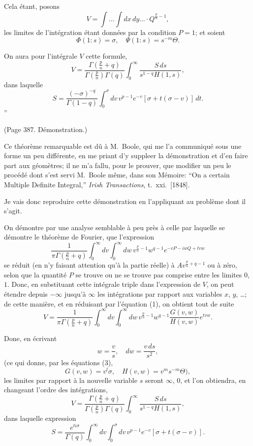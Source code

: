 \documentclass[11pt,a4paper]{book}
\begin{document}
Cela \'{e}tant, posons
\[
V = \int \ldots \int dx\,dy\ldots \cdot Q^{\frac{p}{n}-1}, \tag{2}
\]
les limites de l'int\'{e}gration \'{e}tant donn\'{e}es par la condition $P = 1$; et soient
\[
\Phi(1:s) = \sigma, \quad \Psi(1:s) = s^{-m}\Theta. \tag{3}
\]

On aura pour l'int\'{e}grale $V$ cette formule,
\[
V = \frac{\Gamma(\tfrac{p}{n} + q)}{\Gamma(\tfrac{p}{n})\Gamma(q)}
\int_0^\infty \frac{S\,ds}{s^{1-q}H(1,s)}, \tag{4}
\]
dans laquelle
\[
S = \frac{(-\sigma)^{-q}}{\Gamma(1-q)} \int_0^\sigma dv\,v^{p-1} e^{-v}[\sigma + t(\sigma - v)]\,dt. \tag{5}
\]''

(Page 387. D\'{e}monstration.)

Ce th\'{e}or\`{e}me remarquable est d\^{u} \`{a} M.~Boole, qui me l'a communiqu\'{e} sous une
forme un peu diff\'{e}rente, en me priant d'y suppleer la d\'{e}monstration et d'en faire
part aux g\'{e}om\`{e}tres; il ne m'a fallu, pour le prouver, que modifier un peu le proc\'{e}d\'{e}
dont s'est servi M.~Boole m\^{e}me, dans son M\'{e}moire: ``On a certain Multiple Definite
Integral,'' \textit{Irish Transactions}, t.~xxi.\ [1848].

Je vais donc reproduire cette d\'{e}monstration en l'appliquant au probl\`{e}me dont il s'agit.

On d\'{e}montre par une analyse semblable \`{a} peu pr\`{e}s \`{a} celle par laquelle se d\'{e}montre
le th\'{e}or\`{e}me de Fourier, que l'expression
\[
\frac{1}{\pi\Gamma(\tfrac{p}{n}+q)} \int_0^\infty dv \int_0^\infty dw \, v^{\frac{p}{n}-1} w^{q-1} e^{-vP - iwQ + tvw}
\]
se r\'{e}duit (en n'y faisant attention qu'\`{a} la partie r\'{e}elle) \`{a} $A v^{\frac{p}{n}+q-1}$ ou \`{a} z\'{e}ro, selon que
la quantit\'{e} $P$ se trouve ou ne se trouve pas comprise entre les limites $0$, $1$. Donc,
en substituant cette int\'{e}grale triple dans l'expression de $V$, on peut \'{e}tendre depuis
$-\infty$ jusqu'\`{a} $\infty$ les int\'{e}grations par rapport aux variables $x$, $y$, \ldots; de cette mani\`{e}re,
et en r\'{e}duisant par l'\'{e}quation (1), on obtient tout de suite
\[
V = \frac{1}{\pi\Gamma(\tfrac{p}{n}+q)}
\int_0^\infty dv \int_0^\infty dw \, v^{\frac{p}{n}-1} w^{q-1} \frac{G(v,w)}{H(v,w)} e^{tvw}. \tag{7}
\]

Done, en \'{e}crivant
\[
w = \frac{v}{s}, \quad dw = \frac{v\,ds}{s^2},
\]
(ce qui donne, par les \'{e}quations (3),
\[
G(v,w) = v^l\sigma, \quad H(v,w) = v^m s^{-m}\Theta),
\]
les limites par rapport \`{a} la nouvelle variable $s$ seront $\infty$, $0$, et l'on obtiendra, en
changeant l'ordre des int\'{e}grations,
\[
V = \frac{\Gamma(\tfrac{p}{n}+q)}{\Gamma(\tfrac{p}{n})\Gamma(q)}
\int_0^\infty \frac{S\,ds}{s^{1-q}H(1,s)},
\]
dans laquelle expression
\[
S = \frac{e^{ti\sigma}}{\Gamma(q)} \int_0^\infty dv \int_0^\sigma dv\,v^{p-1} e^{-v}[\sigma + t(\sigma - v)]. \tag{9}
\]
\end{document}
